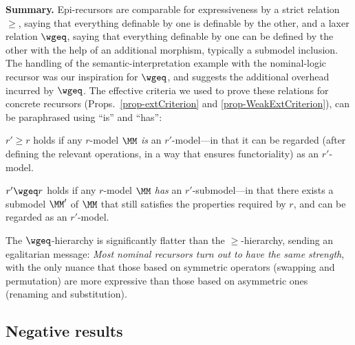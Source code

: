 \medskip
\noindent 
\textbf{Summary. }
Epi-recursors are comparable for expressiveness %
by a strict relation $\geq$, saying that everything definable by one is definable by the other, and a laxer relation $\wgeq$, saying that everything definable by one can be defined by the other with the help of an additional morphism, typically a submodel inclusion.  
The handling of the semantic-interpretation example with the nominal-logic recursor %
was our inspiration for $\wgeq$, and 
suggests the additional %
overhead incurred %
by $\wgeq$.  
%
The effective criteria we used to prove these relations for %
concrete recursors (Props.~\ref{prop-extCriterion} and \ref{prop-WeakExtCriterion}), 
can be paraphrased using ``is'' and ``has'': %
\begin{mmyitem}
\item $r' \geq r$ holds if any $r$-model $\MM$ 
\emph{is} an $r'$-model---in that it can be regarded (after defining the relevant operations, in a way that ensures functoriality) as an $r'$-model. 
%
\item $r' \wgeq r$ holds if any  $r$-model $\MM$ \emph{has} an $r'$-submodel---in that there exists a submodel $\MM'$ of $\MM$ that %
still satisfies the properties required by $r$, and %
can be regarded as an $r'$-model.  
\end{mmyitem}
%
%
The $\wgeq$-hierarchy %
is significantly flatter than the $\geq$-hierarchy,  %
sending an %
egalitarian message: \emph{Most %
	nominal recursors turn out to have the same strength}, with the only nuance that %
those based on 
symmetric operators (swapping and permutation) are more expressive than those based on asymmetric ones (renaming and  substitution). 


\subsection{Negative results}
\label{subsec-negResRec}

